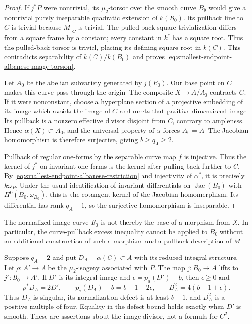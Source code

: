 \begin{proof}
If $j^*P$ were nontrivial, its $\mu_2$-torsor over the smooth curve
$B_0$ would give a nontrivial purely inseparable quadratic extension
of $k(B_0)$.
Its pullback line to $C$ is trivial because $M|_C$ is trivial.
The pulled-back square trivialization differs from a square frame
by a constant; every constant in $k^*$ has a square root.
Thus the pulled-back torsor is trivial, placing its defining square
root in $k(C)$.  This contradicts separability of
$k(C)/k(B_0)$ and proves
\eqref{eq:smallest-endpoint-albanese-image-torsion}.

Let $A_0$ be the abelian subvariety generated by $j(B_0)$.
Our base point on $C$ makes this curve pass through the origin.
The composite $X\to A/A_0$ contracts $C$.
If it were nonconstant, choose a hyperplane section of a projective
embedding of its image which avoids the image of $C$ and meets
that positive-dimensional image.  Its pullback is a nonzero
effective divisor disjoint from $C$, contrary to ampleness.
Hence $\alpha(X)\subset A_0$, and the universal property of
$\alpha$ forces $A_0=A$.
The Jacobian homomorphism is therefore surjective, giving
$b\ge q_A\ge2$.

Pullback of regular one-forms by the separable curve map $f$ is
injective.  Thus the kernel of $j^*$ on invariant one-forms is
the kernel after pulling back further to $C$.
By \eqref{eq:smallest-endpoint-albanese-restriction} and injectivity
of $\alpha^*$, it is precisely $k\omega_P$.
Under the usual identification of invariant differentials on
$\operatorname{Jac}(B_0)$ with $H^0(B_0,\omega_{B_0})$,
this is the cotangent kernel of the Jacobian homomorphism.
Its differential has rank $q_A-1$, so the surjective homomorphism
is inseparable.
\end{proof}

\begin{remark}
\label{rem:smallest-endpoint-albanese-normalized-image-scope}
The normalized image curve $B_0$ is not thereby the base of a
morphism from $X$.  In particular, the curve-pullback excess
inequality cannot be applied to $B_0$ without an additional
construction of such a morphism and a pullback description of $M$.
\end{remark}

\begin{proposition}
\label{prop:smallest-endpoint-albanese-surface-defect}
Suppose $q_A=2$ and put $D_A=\alpha(C)\subset A$ with its reduced
integral structure.  Let $\rho:A'\to A$ be the $\mu_2$-isogeny
associated with $P$.
The map $j:B_0\to A$ lifts to $j':B_0\to A'$.
If $D'$ is its integral image and
$\epsilon=p_a(D')-b$, then $\epsilon\ge0$ and
\begin{equation}\label{eq:smallest-endpoint-albanese-surface-defect}
 \rho^*D_A=2D',\qquad
 p_a(D_A)-b=b-1+2\epsilon,\qquad
 D_A^2=4(b-1+\epsilon).
\end{equation}
Thus $D_A$ is singular, its normalization defect is at least $b-1$,
and $D_A^2$ is a positive multiple of four.
Equality in the defect bound holds exactly when $D'$ is smooth.
These are assertions about the image divisor, not a formula for
$C^2$.
\end{proposition}

